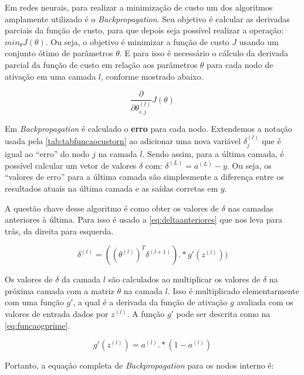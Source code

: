 Em redes neurais, para realizar a minimização de custo um dos algoritmos amplamente utilizado é o \textit{Backpropagation}. Seu objetivo é calcular as derivadas parciais da função de custo, para que depois seja possível realizar a operação: $min_{\theta}J(\theta)$. Ou seja, o objetivo é minimizar a função de custo $J$ usando um conjunto ótimo de parâmetros $\theta$. E para isso é necessário o cálculo da derivada parcial da função de custo em relação aos parâmetros $\theta$ para cada nodo de ativação em uma camada $l$, conforme mostrado abaixo.

\begin{equation}
\frac{\partial}{\partial\theta_{i,j}^{(l)}} J(\theta) \nonumber
\end{equation}


Em \textit{Backpropagation} é calculado o \textbf{erro} para cada nodo. Extendemos a notação usada pela \autoref{tab:tabfuncaocustorn} ao adicionar uma nova variável $\delta_j^{(l)}$ que é igual ao ``erro'' do nodo $j$ na camada $l$. Sendo assim, para a última camada, é possível calcular um vetor de valores $\delta$ com: $\delta^{(L)} = a^{(L)} - y$. Ou seja, os ``valores de erro'' para a última camada são simplesmente a diferença entre os resultados atuais na última camada e as saídas corretas em $y$.

A questão chave desse algoritmo é como obter os valores de $\delta$ nas camadas anteriores à última. Para isso é usado a \autoref{eq:deltaanteriores} que nos leva para trás, da direita para esquerda.

\begin{equation}\label{eq:deltaanteriores}
\delta^{(l)} = ((\theta^{(l)})^T \delta^{(l+1)}) .* g'(z^{(l)}))
\end{equation}

Os valores de $\delta$ da camada $l$ são calculados ao multiplicar os valores de $\delta$ na próxima camada com a matriz $\theta$ na camada $l$. Isso é multiplicado elementarmente com uma função $g'$, a qual é a derivada da função de ativação $g$ avaliada com os valores de entrada dados por $z^{(l)}$. A função $g'$ pode ser descrita como na \autoref{eq:funcaogprime}.

\begin{equation}\label{eq:funcaogprime}
g'(z^{(l)}) = a^{(l)} .* (1 - a^{(l)}) 
\end{equation}

Portanto, a equação completa de \textit{Backpropagation} para os nodos interno é:

